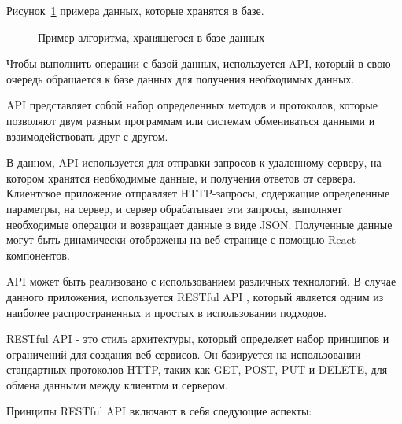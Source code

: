 Рисунок~\ref{src:src1} примера данных, которые хранятся в базе.

\begin{figure}

\caption{Пример алгоритма, хранящегося в базе данных}
\label{src:src1}
\end{figure}

\pagebreak



Чтобы выполнить операции с базой данных, используется API, который в свою очередь обращается к базе данных для получения необходимых данных.

API представляет собой набор определенных методов и протоколов, которые позволяют двум разным программам или системам обмениваться данными и взаимодействовать друг с другом.

В данном, API используется для отправки запросов к удаленному серверу, на котором хранятся необходимые данные, и получения ответов от сервера. Клиентское приложение отправляет HTTP-запросы, содержащие определенные параметры, на сервер, и сервер обрабатывает эти запросы, выполняет необходимые операции и возвращает данные в виде JSON. Полученные данные могут быть динамически отображены на веб-странице с помощью React-компонентов.


API может быть реализовано с использованием различных технологий. В случае данного приложения, используется RESTful API \cite{REST API implementation on android based monitoring application}, который является одним из наиболее распространенных и простых в использовании подходов. 

RESTful API - это стиль архитектуры, который определяет набор принципов и ограничений для создания веб-сервисов. Он базируется на использовании стандартных протоколов HTTP, таких как GET, POST, PUT и DELETE, для обмена данными между клиентом и сервером.

Принципы RESTful API включают в себя следующие аспекты:

